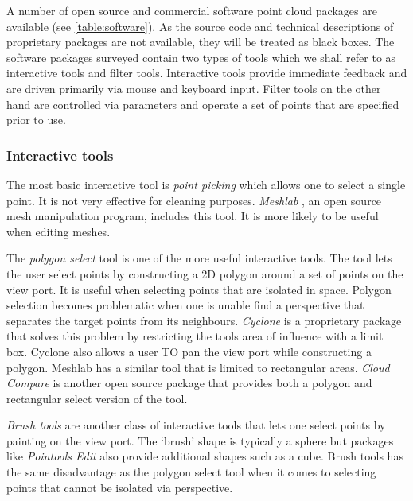 
A number of open source and commercial software point cloud packages are available (see \ref{table:software}). As the source code and technical descriptions of proprietary packages are not available, they will be treated as black boxes. The software packages surveyed contain two types of tools which we shall refer to as interactive tools and filter tools. Interactive tools provide immediate feedback and are driven primarily via mouse and keyboard input. Filter tools on the other hand are controlled via parameters and operate a set of points that are specified prior to use.

\subsubsection{Interactive tools}\label{sec:interactive-tools}

The most basic interactive tool is \emph{point picking} which allows one to select a single point. It is not very effective for cleaning purposes. \emph{Meshlab} \cite{Cignoni2008}, an open source mesh manipulation program, includes this tool. It is more likely to be useful when editing meshes.

The \emph{polygon select} tool is one of the more useful interactive tools. The tool lets the user select points by constructing a 2D polygon around a set of points on the view port. It is useful when selecting points that are isolated in space. Polygon selection becomes problematic when one is unable find a perspective that separates the target points from its neighbours. \emph{Cyclone} is a proprietary package \cite{Leica2012} that solves this problem by restricting the tools area of influence with a limit box. Cyclone also allows a user TO pan the view port while constructing a polygon. Meshlab has a similar tool that is limited to rectangular areas. \emph{Cloud Compare} \cite{CloudCompare} is another open source package that provides both a polygon and rectangular select version of the tool.

\emph{Brush tools} are another class of interactive tools that lets one select points by painting on the view port. The `brush' shape is typically a sphere but packages like \emph{Pointools Edit} \cite{Pointools2012} also provide additional shapes such as a cube. Brush tools has the same disadvantage as the polygon select tool when it comes to selecting points that cannot be isolated via perspective.

